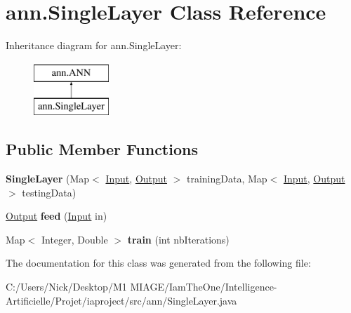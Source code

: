\hypertarget{classann_1_1_single_layer}{}\section{ann.\+Single\+Layer Class Reference}
\label{classann_1_1_single_layer}
Inheritance diagram for ann.\+Single\+Layer\+:\begin{figure}[H]
\begin{center}
\leavevmode
\includegraphics[height=2.000000cm]{classann_1_1_single_layer}
\end{center}
\end{figure}
\subsection*{Public Member Functions}
\begin{DoxyCompactItemize}
\item 
\mbox{\label{classann_1_1_single_layer_ab973ce83e94cfcc1250ca95434950169}} 
{\bfseries Single\+Layer} (Map$<$ \hyperlink{classann_1_1_input}{Input}, \hyperlink{classann_1_1_output}{Output} $>$ training\+Data, Map$<$ \hyperlink{classann_1_1_input}{Input}, \hyperlink{classann_1_1_output}{Output} $>$ testing\+Data)
\item 
\mbox{\label{classann_1_1_single_layer_abf681b102523232e632803dc563bdc07}} 
\hyperlink{classann_1_1_output}{Output} {\bfseries feed} (\hyperlink{classann_1_1_input}{Input} in)
\item 
\mbox{\label{classann_1_1_single_layer_ab03a33e2da33f038384dc51284b22f23}} 
Map$<$ Integer, Double $>$ {\bfseries train} (int nb\+Iterations)
\end{DoxyCompactItemize}


The documentation for this class was generated from the following file\+:\begin{DoxyCompactItemize}
\item 
C\+:/\+Users/\+Nick/\+Desktop/\+M1 M\+I\+A\+G\+E/\+Iam\+The\+One/\+Intelligence-\/\+Artificielle/\+Projet/iaproject/src/ann/Single\+Layer.\+java\end{DoxyCompactItemize}
